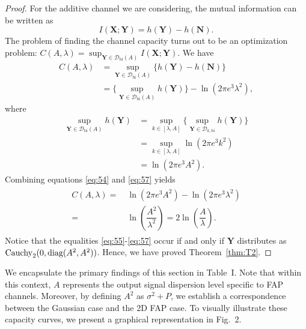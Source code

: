 \documentclass[conference]{IEEEtran}
\theoremstyle{definition}
\theoremstyle{plain}
\begin{document}
\begin{proof}
For the additive channel we are considering, the mutual information can be written as
\begin{equation}
I(\mathbf{X};\mathbf{Y})=h(\mathbf{Y})-h(\mathbf{N}).
\end{equation}
The problem of finding the channel capacity turns out to be an optimization problem:
$
C(A,\lambda)=\sup_{\mathbf{Y}\in\mathcal{D}_{\text{bi}}(A)} I(\mathbf{X};\mathbf{Y}).
$
We have
\begin{align}
    C(A,\lambda)
    &=\sup_{\mathbf{Y} \in \mathcal{D}_{\text{bi}}(A)} \Big\{h(\mathbf{Y} ) - h(\mathbf{N} )\Big\}\\
    &=\Big\{\sup_{\mathbf{Y} \in \mathcal{D}_{\text{bi}}(A)} h(\mathbf{Y} )\Big\} - \ln(2\pi e^3\lambda^2), \label{eq:54}
\end{align}
where
\begin{align}
    \sup_{\mathbf{Y} \in \mathcal{D}_{\text{bi}}(A)} h(\mathbf{Y})
    &=
    \sup_{k\in[\lambda,A]}
    \Big\{ \sup_{\mathbf{Y}\in \mathcal{D}_{k,\text{bi}}} h(\mathbf{Y}) \Big\}\label{eq:55}\\
    &=
    \sup_{k\in[\lambda,A]}
    \ln(2\pi e^3 k^2) \label{eq:56}\\
    &= \ln(2\pi e^3 A^2). \label{eq:57}
\end{align}
Combining equations \eqref{eq:54} and \eqref{eq:57} yields
\begin{align}
\begin{split}
C(A,\lambda)
=&\ \ln(2\pi e^3 A^2) - \ln(2\pi e^3 \lambda^2)\\
=&\ \ln\left(\dfrac{A^2}{\lambda^2}\right)
=2\ln\left(\dfrac{A}{\lambda}\right).
\end{split}
\end{align}
Notice that the equalities \eqref{eq:55}-\eqref{eq:57} occur if and only if $\mathbf{Y}$ distributes as ${\rm Cauchy}_2(0,\text{diag}(A^2,A^2))$. Hence, we have proved Theorem~\ref{thm:T2}.
\end{proof}
\color{black}

We encapsulate the primary findings of this section in Table~I. Note that within this context, $A$ represents the output signal dispersion level specific to FAP channels. Moreover, by defining $A^2$ as $\sigma^2+P$, we establish a correspondence between the Gaussian case and the 2D FAP case. To visually illustrate these capacity curves, we present a graphical representation in Fig.~2.

\end{document}
